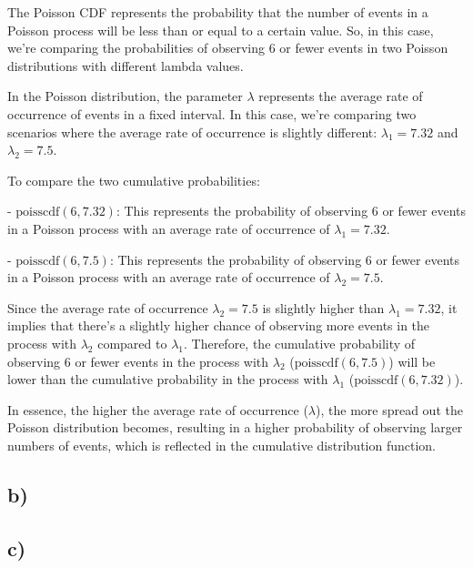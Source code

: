 \documentclass[12pt]{article}
\begin{document}
The Poisson CDF represents the probability that the number of events in a Poisson process will be less than or equal to a certain value. So, in this case, we're comparing the probabilities of observing 6 or fewer events in two Poisson distributions with different lambda values.

In the Poisson distribution, the parameter $\lambda$ represents the average rate of occurrence of events in a fixed interval. In this case, we're comparing two scenarios where the average rate of occurrence is slightly different: $\lambda_1 = 7.32$ and $\lambda_2 = 7.5$.

To compare the two cumulative probabilities:

- $\text{poisscdf}(6, 7.32)$: This represents the probability of observing 6 or fewer events in a Poisson process with an average rate of occurrence of $\lambda_1 = 7.32$.

- $\text{poisscdf}(6, 7.5)$: This represents the probability of observing 6 or fewer events in a Poisson process with an average rate of occurrence of $\lambda_2 = 7.5$.

Since the average rate of occurrence $\lambda_2 = 7.5$ is slightly higher than $\lambda_1 = 7.32$, it implies that there's a slightly higher chance of observing more events in the process with $\lambda_2$ compared to $\lambda_1$. Therefore, the cumulative probability of observing 6 or fewer events in the process with $\lambda_2$ ($\text{poisscdf}(6, 7.5)$) will be lower than the cumulative probability in the process with $\lambda_1$ ($\text{poisscdf}(6, 7.32)$).

In essence, the higher the average rate of occurrence ($\lambda$), the more spread out the Poisson distribution becomes, resulting in a higher probability of observing larger numbers of events, which is reflected in the cumulative distribution function.


\subsection*{b)} 
\subsection*{c)} 
\end{document}
